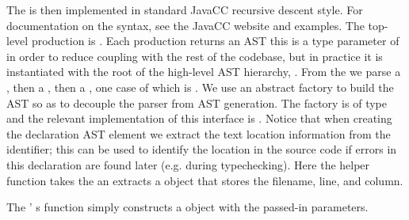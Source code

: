 \documentclass{article}
\begin{document}
\begin{mdP}[class={indent},data-line={141}]%
{}The %
{}%
{} is then implemented in standard JavaCC recursive
descent style.  For documentation on the syntax, see the JavaCC
website and examples.  The top-level production is %
{}%
{}.
Each production returns an AST%
{}{\textendash}%
{}this is a type parameter of
{}%
{} in order to reduce coupling with the rest of the
codebase, but in practice it is instantiated with the root of the
high-level AST hierarchy, %
{}%
{}.
From the %
{}%
{} we parse a %
{}%
{}, then a
{}%
{}, then a %
{}%
{}, one case of which is
{}%
{}.  We use an abstract factory to build the AST so as
to decouple the parser from AST generation.  The factory is of type
{}%
{} and the relevant
implementation of this interface is
{}%
{}.  Notice that when
creating the %
{}%
{} declaration AST element we extract the text location
information from the identifier; this can be used to identify the
location in the source code if errors in this declaration are found
later (e.g. during typechecking).  Here the %
{}%
{} helper function
takes the %
{}%
{} an extracts a %
{}%
{} object that stores the
filename, line, and column.%
\end{mdP}%
\begin{mdP}[class={indent},data-line={162}]%
{}The %
{}%
{}{'}%
{}s %
{}%
{} function simply constructs a
{}%
{} object
with the passed-in parameters.%
\end{mdP}%
\end{document}
